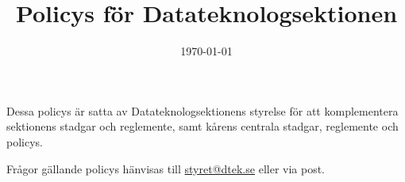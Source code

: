 \documentclass{dtek}
\title{Policys för Datateknologsektionen}
\author{}
\date{\today}
\begin{document}
\makeheadfoot

\begin{center}
\maketitle
\end{center}
Dessa policys är satta av Datateknologsektionens styrelse för att komplementera sektionens stadgar och reglemente, samt kårens centrala stadgar, reglemente och policys.

Frågor gällande policys hänvisas till \hyperlink{mailto:styret@dtek.se}{styret@dtek.se} eller via post.

\setcounter{tocdepth}{1}
\tableofcontents

%
\newpage

\newpage

\newpage

\newpage

\newpage

\end{document}
